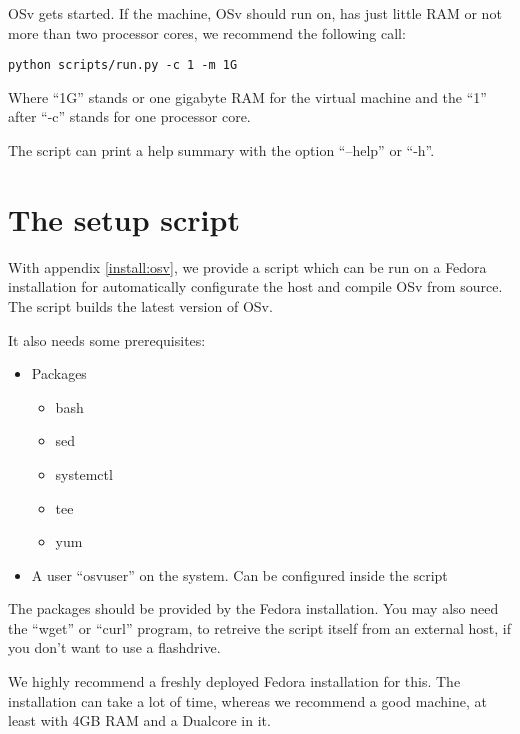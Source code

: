     OSv gets started. If the machine, OSv should run on, has just little RAM or
    not more than two processor cores, we recommend the following call:

\begin{lstlisting}
python scripts/run.py -c 1 -m 1G
\end{lstlisting}

    Where ``1G'' stands or one gigabyte RAM for the virtual machine and the
    ``1'' after  ``-c'' stands for one processor core.

    The script can print a help summary with the option ``--help'' or ``-h''.

\chapter{The setup script}

    With appendix \ref{install:osv}, we provide a script which can be run on a
    Fedora installation for automatically configurate the host and compile OSv
    from source. The script builds the latest version of OSv.

    It also needs some prerequisites:

        \begin{itemize}
            \item Packages
            \begin{itemize}
                \item bash
                \item sed
                \item systemctl
                \item tee
                \item yum
            \end{itemize}

            \item A user ``osvuser'' on the system. Can be configured inside the
            script
        \end{itemize}

    The packages should be provided by the Fedora installation. You may also
    need the ``wget'' or ``curl'' program, to retreive the script itself from an
    external host, if you don't want to use a flashdrive.

    We highly recommend a freshly deployed Fedora installation for this. The
    installation can take a lot of time, whereas we recommend a good machine, at
    least with 4GB RAM and a Dualcore in it.


